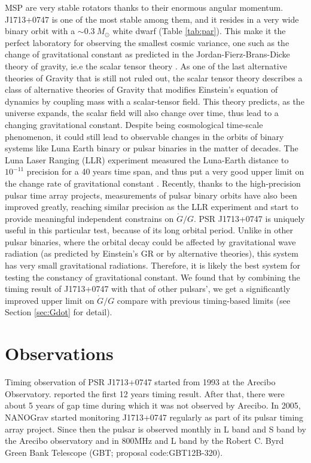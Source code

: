 MSP are very stable rotators thanks to their enormous angular momentum.
J1713+0747 is one of
the most stable among them, and it resides in a very wide binary orbit
with a $\sim0.3~M_{\odot}$ white dwarf (Table \ref{tab:par}). This make it the
perfect laboratory for observing the smallest cosmic variance, one such as the
change of gravitational constant as predicted in the Jordan-Fierz-Brans-Dicke
theory of gravity, ie.e the scalar tensor theory \citep{jor59,fie56,bd61}. 
As one of the last alternative theories of Gravity that is still not
ruled out, the scalar tensor theory describes a class of alternative theories of Gravity
that modifies Einstein's equation of dynamics by coupling mass with a scalar-tensor field.
This theory predicts, as the universe expands, the scalar field will
also change over time, thus lead to a changing gravitational constant. Despite
being cosmological time-scale phenomenon, it could still lead to observable 
changes in the orbits of binary systems like Luna Earth binary or pulsar
binaries in the matter of decades. The Luna Laser Ranging (LLR) experiment measured the
Luna-Earth distance to $10^{-11}$ precision for a 40 years time span, and thus put a
very good upper limit on the change rate of gravitational constant
\citep{hmb10}. Recently, thanks to the high-precision pulsar time array
projects, measurements of pulsar binary orbits have also been improved
greatly, reaching similar precision as the LLR experiment and start to provide
meaningful independent constrains on $\dot{G}/G$. PSR J1713+0747 is uniquely
useful in this particular test, because of its long orbital period. Unlike in
other pulsar binaries, where the orbital decay could be affected by
gravitational wave radiation (as predicted by Einstein's GR or by 
alternative theories), this system has very small gravitational radiations. 
Therefore, it is likely the best system for testing the constancy of
gravitational constant. We found that by combining the timing result of
J1713+0747 with that of other pulsars', we get a significantly improved upper limit
on $\dot{G}/G$ compare with previous timing-based limits (see Section
\ref{sec:Gdot} for detail).


\section{Observations}
Timing observation of PSR J1713+0747 started from 1993 at the Arecibo
Observatory. \citet{sns+05} reported the first 12 years timing result. After
that, there were about 5 years of gap time during which it was not observed by
Arecibo.  In 2005, NANOGrav started monitoring  J1713+0747 regularly as part
of  its pulsar timing array project. Since then the pulsar is observed monthly
in L band and S band by the Arecibo
observatory and in 800MHz and L band by the Robert C. Byrd Green Bank
Telescope (GBT; proposal code:GBT12B-320).

